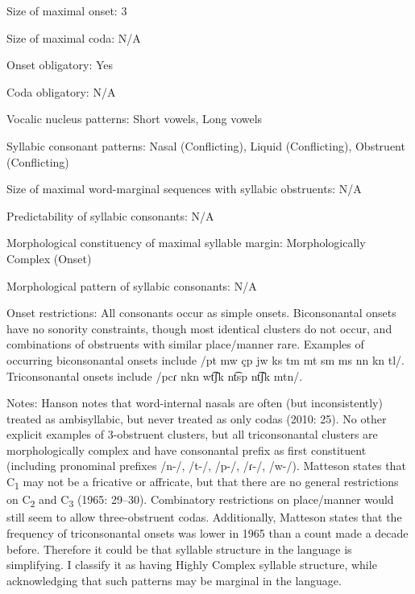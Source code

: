 {\begin{appendixdesc}
\item[Size of maximal onset:] 3

\item[Size of maximal coda:] N/A

\item[Onset obligatory:] Yes

\item[Coda obligatory:] N/A

\item[Vocalic nucleus patterns:] Short vowels, Long vowels

\item[Syllabic consonant patterns:] Nasal (Conflicting), Liquid (Conflicting), Obstruent (Conflicting)

\item[Size of maximal word-marginal sequences with syllabic obstruents:] N/A

\item[Predictability of syllabic consonants:] N/A

\item[Morphological constituency of maximal syllable margin:] Morphologically Complex (Onset)

\item[Morphological pattern of syllabic consonants:] N/A

\item[Onset restrictions:] All consonants occur as simple onsets. Biconsonantal onsets have no sonority constraints, though most identical clusters do not occur, and combinations of obstruents with similar place/manner rare. Examples of occurring biconsonantal onsets include /pt mw çp jw ks tm mt sm ms nn kn tl/. Triconsonantal onsets include /pcɾ nkn wt͡ʃk nt͡sp nt͡ʃk mtn/.

\item[Notes:] Hanson notes that word-internal nasals are often (but inconsistently) treated as ambisyllabic, but never treated as only codas (2010: 25). No other explicit examples of 3-obstruent clusters, but all triconsonantal clusters are morphologically complex and have consonantal prefix as first constituent (including pronominal prefixes /n-/, /t-/, /p-/, /ɾ{}-/, /w-/). Matteson states that C\textsubscript{1} may not be a fricative or affricate, but that there are no general restrictions on C\textsubscript{2} and C\textsubscript{3} (1965: 29--30). Combinatory restrictions on place/manner would still seem to allow three-obstruent codas. Additionally, Matteson states that the frequency of triconsonantal onsets was lower in 1965 than a count made a decade before. Therefore it could be that syllable structure in the language is simplifying. I classify it as having Highly Complex syllable structure, while acknowledging that such patterns may be marginal in the language.
\end{appendixdesc}
}

